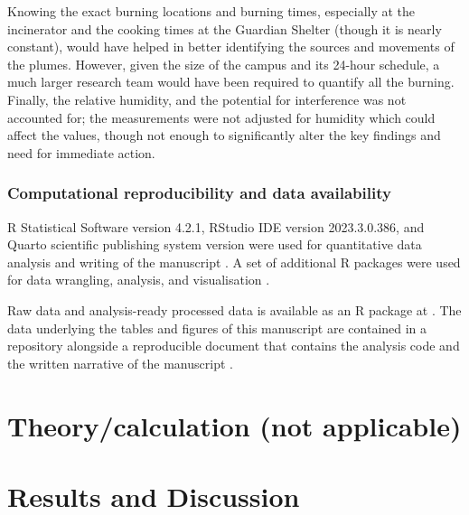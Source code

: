 \documentclass[
  authoryear,
  review,
  3p]{elsarticle}
\begin{document}
Knowing the exact burning locations and burning times, especially at the
incinerator and the cooking times at the Guardian Shelter (though it is
nearly constant), would have helped in better identifying the sources
and movements of the plumes. However, given the size of the campus and
its 24-hour schedule, a much larger research team would have been
required to quantify all the burning. Finally, the relative humidity,
and the potential for interference was not accounted for; the
measurements were not adjusted for humidity which could affect the
values, though not enough to significantly alter the key findings and
need for immediate action.

\hypertarget{computational-reproducibility-and-data-availability}{%
\subsubsection{Computational reproducibility and data
availability}\label{computational-reproducibility-and-data-availability}}

R Statistical Software version 4.2.1, RStudio IDE version 2023.3.0.386,
and Quarto scientific publishing system version were used for
quantitative data analysis and writing of the manuscript
\citep{R-base, allaire2022quartoa, positteam2023rstudio}. A set of
additional R packages were used for data wrangling, analysis, and
visualisation
\citep{ggplot22016, lubridate2011, R-dplyr, R-forcats, R-ggplot2, R-janitor, R-leaflet, R-lubridate, R-mapview, R-readr, R-tidyr, R-waffle}.

Raw data and analysis-ready processed data is available as an R package
at \citet{R-qechairquality}. The data underlying the tables and figures
of this manuscript are contained in a repository alongside a
reproducible document that contains the analysis code and the written
narrative of the manuscript \citep{schobitz2023manuscript}.

\hypertarget{theorycalculation-not-applicable}{%
\section{Theory/calculation (not
applicable)}\label{theorycalculation-not-applicable}}

\hypertarget{results-and-discussion}{%
\section{Results and Discussion}\label{results-and-discussion}}
\end{document}
